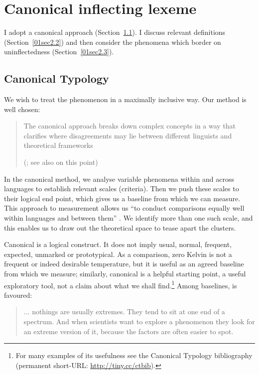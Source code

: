 \documentclass[output=paper,colorlinks,citecolor=brown]{langscibook}
\begin{document}
\section{Canonical inflecting lexeme} \label{01sec2}

\largerpage
I adopt a canonical approach (Section~\ref{01sec2.1}). I discuss relevant definitions (Section~\ref{01sec2.2}) and then consider the phenomena which border on uninflectedness (Section~\ref{01sec2.3}).

\subsection{Canonical Typology} \label{01sec2.1}

We wish to treat the phenomenon in a maximally inclusive way. Our method is well chosen:

\begin{quote}
	The canonical approach breaks down complex concepts in a way that clarifies where disagreements may lie between different linguists and theoretical frameworks
	
	\hfill (\citealt[100]{nikolaeva2013}; see also \citealt{round2023} on this point)
\end{quote}

In the canonical method, we analyse variable phenomena within and across languages to establish relevant scales (criteria). Then we push these scales to their logical end point, which gives us a baseline from which we can measure. This approach to measurement allows us ``to conduct comparisons equally well within languages and between them'' \citep{roundcorbett2020}. We identify more than one such scale, and this enables us to draw out the theoretical space to tease apart the clusters.

Canonical is a logical construct. It does not imply usual, normal, frequent, expected, unmarked or prototypical. As a comparison, zero Kelvin is not a frequent or indeed desirable temperature, but it is useful as an agreed baseline from which we measure; similarly, canonical is a helpful starting point, a useful exploratory tool, not a claim about what we shall find.\footnote{For many examples of its usefulness see the Canonical Typology bibliography (permanent short-URL: \url{http://tiny.cc/ctbib}).} Among baselines,  is favoured:

\begin{quote}
	... nothings are usually extremes. They tend to sit at one end of a spectrum. And when scientists want to explore a phenomenon they look for an extreme version of it, because the factors are often easier to spot.
	
	\hfill \citet[2]{webb2013}
\end{quote}
\end{document}
